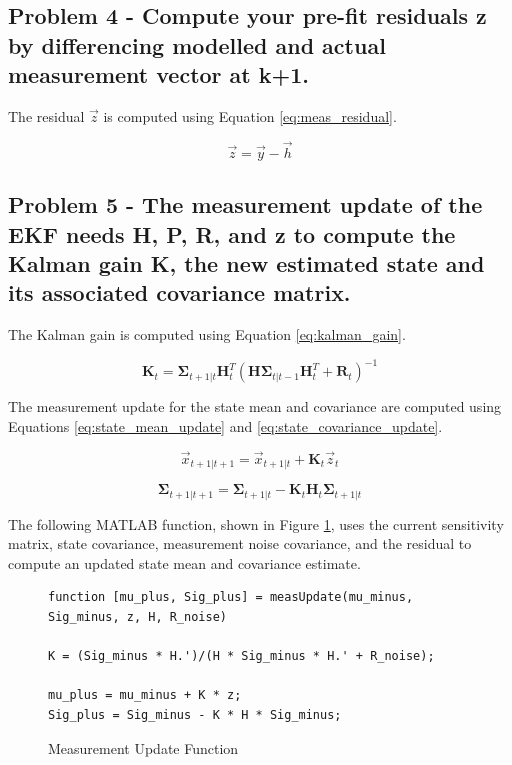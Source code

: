 \subsection{Problem 4 - Compute your pre-fit residuals z by differencing modelled and actual measurement vector at k+1.}

The residual $\vec{z}$ is computed using Equation \ref{eq:meas_residual}.

\begin{equation} \label{eq:meas_residual}
    \vec{z} = \vec{y} - \vec{h}
\end{equation}

\subsection{Problem 5 - The measurement update of the EKF needs H, P, R, and z to compute the Kalman gain K, the new estimated state and its associated covariance matrix.}

The Kalman gain is computed using Equation \ref{eq:kalman_gain}.

\begin{equation} \label{eq:kalman_gain}
    \boldsymbol{K}_t = \boldsymbol{\Sigma}_{t+1 \vert t} \boldsymbol{H}_t^T \left( \boldsymbol{H} \boldsymbol{\Sigma}_{t \vert t-1} \boldsymbol{H}_t^T + \boldsymbol{R}_t \right)^{-1}
\end{equation}

The measurement update for the state mean and covariance are computed using Equations \ref{eq:state_mean_update} and \ref{eq:state_covariance_update}.

\begin{equation} \label{eq:state_mean_update}
    \vec{x}_{t+1 \vert t+1} = \vec{x}_{t+1 \vert t} + \boldsymbol{K}_t \vec{z}_t
\end{equation}

\begin{equation} \label{eq:state_covariance_update}
    \boldsymbol{\Sigma}_{t+1 \vert t+1} = \boldsymbol{\Sigma}_{t+1 \vert t} - \boldsymbol{K}_t \boldsymbol{H}_t \boldsymbol{\Sigma}_{t+1 \vert t}
\end{equation}

The following MATLAB function, shown in Figure \ref{fig:meas_update_matlab_func}, uses the current sensitivity matrix, state covariance, measurement noise covariance, and the residual to compute an updated state mean and covariance estimate.

\begin{figure}[H]
    \centering
    \captionsetup{ justification = centering}
    \begin{lstlisting}
function [mu_plus, Sig_plus] = measUpdate(mu_minus, Sig_minus, z, H, R_noise)

K = (Sig_minus * H.')/(H * Sig_minus * H.' + R_noise);

mu_plus = mu_minus + K * z;
Sig_plus = Sig_minus - K * H * Sig_minus;
    \end{lstlisting}
    \caption{Measurement Update Function}
    \label{fig:meas_update_matlab_func}
\end{figure}

